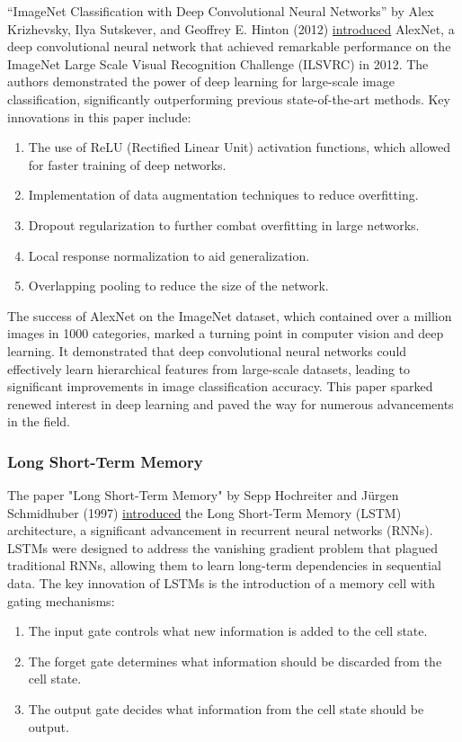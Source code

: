 \documentclass{article}
\begin{document}
``ImageNet Classification with Deep Convolutional Neural Networks'' by Alex Krizhevsky, Ilya Sutskever, and Geoffrey E. Hinton (2012) \href{https://papers.nips.cc/paper/2012/file/c399862d3b9d6b76c8436e924a68c45b-Paper.pdf}{introduced} AlexNet, a deep convolutional neural network that achieved remarkable performance on the ImageNet Large Scale Visual Recognition Challenge (ILSVRC) in 2012.\cite{Krizhevsky2012} The authors demonstrated the power of deep learning for large-scale image classification, significantly outperforming previous state-of-the-art methods. Key innovations in this paper include:
\begin{enumerate}
    \item The use of ReLU (Rectified Linear Unit) activation functions, which allowed for faster training of deep networks.
    \item Implementation of data augmentation techniques to reduce overfitting.
    \item Dropout regularization to further combat overfitting in large networks.
    \item Local response normalization to aid generalization.
    \item Overlapping pooling to reduce the size of the network.
\end{enumerate}

The success of AlexNet on the ImageNet dataset, which contained over a million images in 1000 categories, marked a turning point in computer vision and deep learning. It demonstrated that deep convolutional neural networks could effectively learn hierarchical features from large-scale datasets, leading to significant improvements in image classification accuracy. This paper sparked renewed interest in deep learning and paved the way for numerous advancements in the field.

\subsubsection*{Long Short-Term Memory}

The paper "Long Short-Term Memory" by Sepp Hochreiter and Jürgen Schmidhuber (1997) \href{https://www.researchgate.net/publication/13853244_Long_Short-term_Memory}{introduced} the Long Short-Term Memory (LSTM) architecture, a significant advancement in recurrent neural networks (RNNs).\cite{Hochreiter1997} LSTMs were designed to address the vanishing gradient problem that plagued traditional RNNs, allowing them to learn long-term dependencies in sequential data. The key innovation of LSTMs is the introduction of a memory cell with gating mechanisms:
\begin{enumerate}
    \item The input gate controls what new information is added to the cell state.
    \item The forget gate determines what information should be discarded from the cell state.
    \item The output gate decides what information from the cell state should be output.
\end{enumerate}
\end{document}
